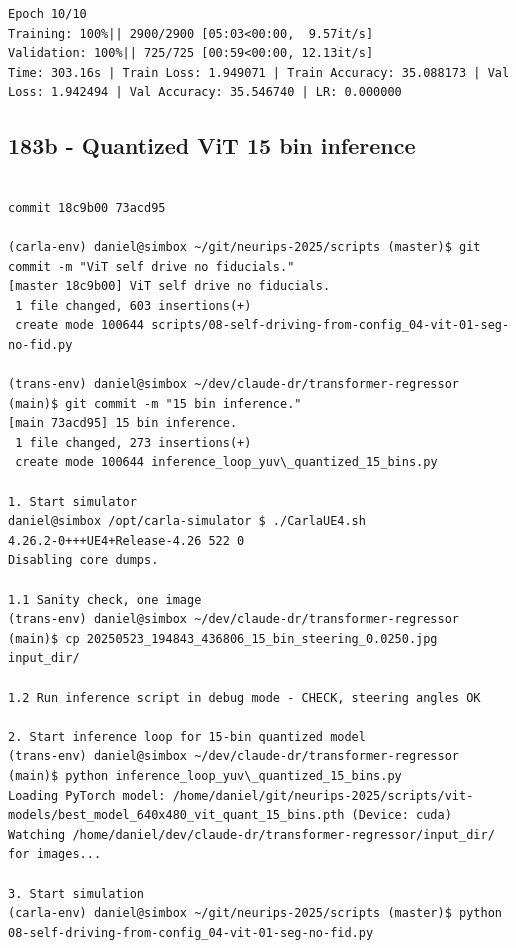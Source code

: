 \begin{verbatim}
Epoch 10/10
Training: 100%|| 2900/2900 [05:03<00:00,  9.57it/s]
Validation: 100%|| 725/725 [00:59<00:00, 12.13it/s]
Time: 303.16s | Train Loss: 1.949071 | Train Accuracy: 35.088173 | Val Loss: 1.942494 | Val Accuracy: 35.546740 | LR: 0.000000

\end{verbatim}

\subsection{183b - Quantized ViT 15 bin inference}
\label{app_res:183b}

\begin{verbatim}

commit 18c9b00 73acd95

(carla-env) daniel@simbox ~/git/neurips-2025/scripts (master)$ git commit -m "ViT self drive no fiducials."
[master 18c9b00] ViT self drive no fiducials.
 1 file changed, 603 insertions(+)
 create mode 100644 scripts/08-self-driving-from-config_04-vit-01-seg-no-fid.py

(trans-env) daniel@simbox ~/dev/claude-dr/transformer-regressor (main)$ git commit -m "15 bin inference."
[main 73acd95] 15 bin inference.
 1 file changed, 273 insertions(+)
 create mode 100644 inference_loop_yuv\_quantized_15_bins.py
 
1. Start simulator
daniel@simbox /opt/carla-simulator $ ./CarlaUE4.sh 
4.26.2-0+++UE4+Release-4.26 522 0
Disabling core dumps.

1.1 Sanity check, one image
(trans-env) daniel@simbox ~/dev/claude-dr/transformer-regressor (main)$ cp 20250523_194843_436806_15_bin_steering_0.0250.jpg input_dir/

1.2 Run inference script in debug mode - CHECK, steering angles OK

2. Start inference loop for 15-bin quantized model
(trans-env) daniel@simbox ~/dev/claude-dr/transformer-regressor (main)$ python inference_loop_yuv\_quantized_15_bins.py
Loading PyTorch model: /home/daniel/git/neurips-2025/scripts/vit-models/best_model_640x480_vit_quant_15_bins.pth (Device: cuda)
Watching /home/daniel/dev/claude-dr/transformer-regressor/input_dir/ for images...

3. Start simulation
(carla-env) daniel@simbox ~/git/neurips-2025/scripts (master)$ python 08-self-driving-from-config_04-vit-01-seg-no-fid.py



\end{verbatim}
